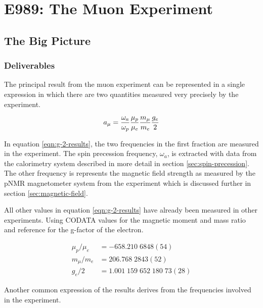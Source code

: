 \chapter {E989: The Muon \gmtwo Experiment} \label{ch:expt}

\section{The Big Picture} \label{sec:expt-big-picture}

\subsection{Deliverables}

The principal result from the muon \gmtwo experiment can be represented in a single expression in which there are two quantities measured very precisely by the experiment.

\begin{equation}
\label{eqn:g-2-results}
a_\mu = \frac{\omega_a}{\omega_p} \frac{\mu_p}{\mu_e} \\
\frac{m_\mu}{m_e} \frac{g_e}{2}
\end{equation}

\noindent
In equation \ref{eqn:g-2-results}, the two frequencies in the first fraction are measured in the experiment.  The spin precession frequency, $\omega_a$, is extracted with data from the calorimetry system described in more detail in section \ref{sec:spin-precession}.  The other frequency is represents the magnetic field strength as measured by the pNMR magnetometer system from the experiment which is discussed further in section \ref{sec:magnetic-field}.

All other values in equation \ref{eqn:g-2-results} have already been measured in other experiments. Using CODATA values \cite{codata} for the magnetic moment and mass ratio and reference \cite{g-e-measurement} for the g-factor of the electron.

\begin{align}
\mu_p/\mu_e & = -658.210\;6848(54) \\
m_\mu/m_e & = 206.768\;2843(52) \\
g_e/2 & = 1.001\;159\;652\;180\;73(28)
\end{align}

Another common expression of the \mugmtwo results derives from the frequencies involved in the experiment.

